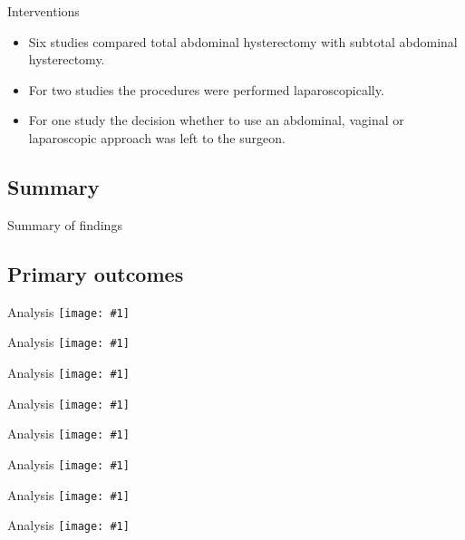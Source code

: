 \documentclass{beamer}
\newcommand*{\solo}[1]{\centering\texttt{[image: \#1]}}
\begin{document}
\begin{frame}{Interventions}
    \begin{itemize}
        \item Six studies compared total abdominal hysterectomy with subtotal abdominal hysterectomy.
        \item For two studies the procedures were performed laparoscopically.
        \item For one study the decision whether to use an abdominal, vaginal or laparoscopic approach was left to the surgeon.
    \end{itemize}
\end{frame}

\subsection{Summary}
\begin{frame}{Summary of findings}
    \only<1>{\solo{T1.eps}}
    \only<2>{\solo{T2.eps}}
\end{frame}

\subsection{Primary outcomes}
\begin{frame}{Analysis}
    \solo{A1.eps}
\end{frame}

\begin{frame}{Analysis}
    \solo{A2.eps}
\end{frame}

\begin{frame}{Analysis}
    \solo{A3.eps}
\end{frame}

\begin{frame}{Analysis}
    \solo{A4.eps}
\end{frame}

\begin{frame}{Analysis}
    \solo{A5.eps}
\end{frame}

\begin{frame}{Analysis}
    \solo{A5.eps}
\end{frame}

\begin{frame}{Analysis}
    \solo{A6.eps}
\end{frame}

\begin{frame}{Analysis}
    \solo{A7.eps}
\end{frame}
\end{document}
